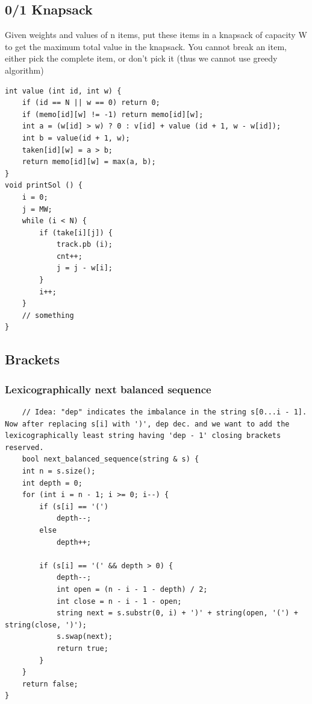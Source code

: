 \documentclass[8pt, a4paper, oneside, twocolumn]{extarticle}
\begin{document}
\subsection{0/1 Knapsack}
Given weights and values of n items, put these items in a knapsack of capacity W to get the maximum total value in the knapsack. You cannot break an item, either pick the complete item, or don’t pick it (thus we cannot use greedy algorithm)
\begin{verbatim}
int value (int id, int w) {
    if (id == N || w == 0) return 0;
    if (memo[id][w] != -1) return memo[id][w];
    int a = (w[id] > w) ? 0 : v[id] + value (id + 1, w - w[id]);
    int b = value(id + 1, w);
    taken[id][w] = a > b;
    return memo[id][w] = max(a, b);
}
void printSol () {
    i = 0;
    j = MW;
    while (i < N) {
        if (take[i][j]) {
            track.pb (i);
            cnt++;
            j = j - w[i];
        }
        i++;
    }
    // something
}
\end{verbatim}
\subsection{Brackets}
\subsubsection{Lexicographically next balanced sequence}
\begin{verbatim}
	// Idea: "dep" indicates the imbalance in the string s[0...i - 1]. Now after replacing s[i] with ')', dep dec. and we want to add the lexicographically least string having 'dep - 1' closing brackets reserved.
	bool next_balanced_sequence(string & s) {
    int n = s.size();
    int depth = 0;
    for (int i = n - 1; i >= 0; i--) {
        if (s[i] == '(')
            depth--;
        else
            depth++;

        if (s[i] == '(' && depth > 0) {
            depth--;
            int open = (n - i - 1 - depth) / 2;
            int close = n - i - 1 - open;
            string next = s.substr(0, i) + ')' + string(open, '(') + string(close, ')');
            s.swap(next);
            return true;
        }
    }
    return false;
}
\end{verbatim}
\end{document}
